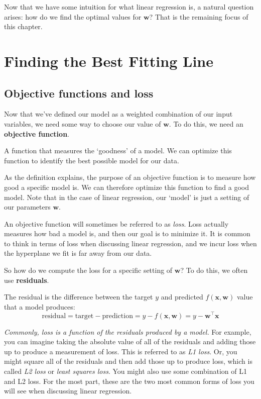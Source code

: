 Now that we have some intuition for what linear regression is, a natural question arises: how do we find the optimal values for $\bm w$? That is the remaining focus of this chapter.

\section{Finding the Best Fitting Line}

\subsection{Objective functions and loss}
Now that we've defined our model as a weighted combination of our input variables, we need some way to choose our value of $\mathbf{w}$. To do this, we need an \textbf{objective function}.

\begin{definition}
    A function that measures the `goodness' of a model. We can optimize this function to identify the best possible model for our data.
\end{definition}

As the definition explains, the purpose of an objective function is to measure how good a specific model is. We can therefore optimize this function to find a good model. Note that in the case of linear regression, our `model' is just a setting of our parameters $\mathbf{w}$.

An objective function will sometimes be referred to as \textit{loss}. Loss actually measures how bad a model is, and then our goal is to minimize it. It is common to think in terms of loss when discussing linear regression, and we incur loss when the hyperplane we fit is far away from our data.

So how do we compute the loss for a specific setting of $\mathbf{w}$? To do this, we often use \textbf{residuals}.

\begin{definition}[residual]
    The residual is the difference between the target $y$ and predicted $f(\mathbf{x}, \mathbf{w})$ value that a model produces: $$\text{residual} = \text{target} - \text{prediction} = y - f(\mathbf{x}, \mathbf{w}) = y - \mathbf{w}^\top\mathbf{x}$$
\end{definition}

\textit{Commonly, loss is a function of the residuals produced by a model.} For example, you can imagine taking the absolute value of all of the residuals and adding those up to produce a measurement of loss. This is referred to as \textit{L1 loss}. Or, you might square all of the residuals and then add those up to produce loss, which is called \textit{L2 loss} or \textit{least squares loss}. You might also use some combination of L1 and L2 loss. For the most part, these are the two most common forms of loss you will see when discussing linear regression.

